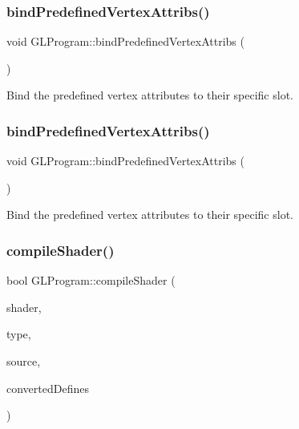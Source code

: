\subsubsection{\texorpdfstring{bind\+Predefined\+Vertex\+Attribs()}{bindPredefinedVertexAttribs()}\hspace{0.1cm}{\footnotesize\ttfamily [1/2]}}
{\footnotesize\ttfamily void G\+L\+Program\+::bind\+Predefined\+Vertex\+Attribs (\begin{DoxyParamCaption}{ }\end{DoxyParamCaption})\hspace{0.3cm}{\ttfamily [protected]}}

Bind the predefined vertex attributes to their specific slot. \mbox{\label{classGLProgram_a04b7cb22e180a7da65e7eecd4f253b9c}} 
\subsubsection{\texorpdfstring{bind\+Predefined\+Vertex\+Attribs()}{bindPredefinedVertexAttribs()}\hspace{0.1cm}{\footnotesize\ttfamily [2/2]}}
{\footnotesize\ttfamily void G\+L\+Program\+::bind\+Predefined\+Vertex\+Attribs (\begin{DoxyParamCaption}{ }\end{DoxyParamCaption})\hspace{0.3cm}{\ttfamily [protected]}}

Bind the predefined vertex attributes to their specific slot. \mbox{\label{classGLProgram_a839b443a144c0f29044f0ccadcf96d99}} 
\subsubsection{\texorpdfstring{compile\+Shader()}{compileShader()}\hspace{0.1cm}{\footnotesize\ttfamily [1/2]}}
{\footnotesize\ttfamily bool G\+L\+Program\+::compile\+Shader (\begin{DoxyParamCaption}\item[{G\+Luint $\ast$}]{shader,  }\item[{G\+Lenum}]{type,  }\item[{const G\+Lchar $\ast$}]{source,  }\item[{const std\+::string \&}]{converted\+Defines }\end{DoxyParamCaption})\hspace{0.3cm}{\ttfamily [protected]}}

